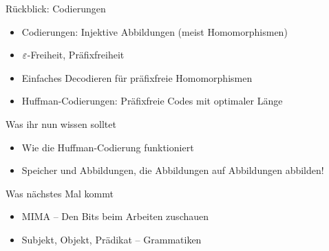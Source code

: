 \framePrevEpisode

\begin{frame}{Rückblick: Codierungen}
	\begin{itemize}
		\item Codierungen: Injektive Abbildungen (meist Homomorphismen)
		\item $\varepsilon$-Freiheit, Präfixfreiheit
		\item Einfaches Decodieren für präfixfreie Homomorphismen
		\item Huffman-Codierungen: Präfixfreie Codes mit optimaler Länge
	\end{itemize}
\end{frame}








%


\begin{frame}	
	\begin{block}{Was ihr nun wissen solltet}
		\begin{itemize}
			\item Wie die Huffman-Codierung funktioniert
			\item Speicher und Abbildungen, die Abbildungen auf Abbildungen abbilden!
		\end{itemize}
	\end{block}
	
	\begin{block}{Was nächstes Mal kommt}
		\begin{itemize}
			\item MIMA – Den Bits beim Arbeiten zuschauen
			\item Subjekt, Objekt, Prädikat – Grammatiken
		\end{itemize}
	\end{block}
\end{frame}


\slideThanks

